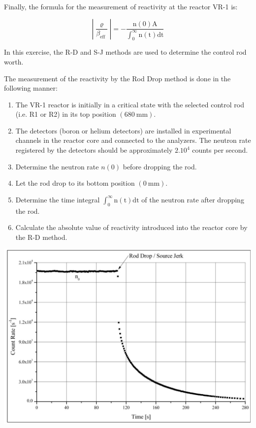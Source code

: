 \documentclass[10pt]{article}
\begin{document}
Finally, the formula for the measurement of reactivity at the reactor VR-1 is:

$$
\left|\frac{\varrho}{\beta_{\text {eff }}}\right|=-\frac{\mathrm{n}(0) \mathrm{A}}{\int_{0}^{\infty} \mathrm{n}(\mathrm{t}) \mathrm{dt}}
$$

In this exercise, the R-D and S-J methods are used to determine the control rod worth.

The measurement of the reactivity by the Rod Drop method is done in the following manner:

\begin{enumerate}
  \item The VR-1 reactor is initially in a critical state with the selected control rod (i.e. R1 or R2) in its top position $(680 \mathrm{~mm})$.

  \item The detectors (boron or helium detectors) are installed in experimental channels in the reactor core and connected to the analyzers. The neutron rate registered by the detectors should be approximately $2.10^{4}$ counts per second.

  \item Determine the neutron rate $n(0)$ before dropping the rod.

  \item Let the rod drop to its bottom position $(0 \mathrm{~mm})$.

  \item Determine the time integral $\int_{0}^{\infty} \mathrm{n}(\mathrm{t}) \mathrm{dt}$ of the neutron rate after dropping the rod.

  \item Calculate the absolute value of reactivity introduced into the reactor core by the R-D method.

\end{enumerate}

\begin{center}
\includegraphics[max width=\textwidth]{2023_01_12_fb43672477d35ecded7eg-5}
\end{center}
\end{document}
